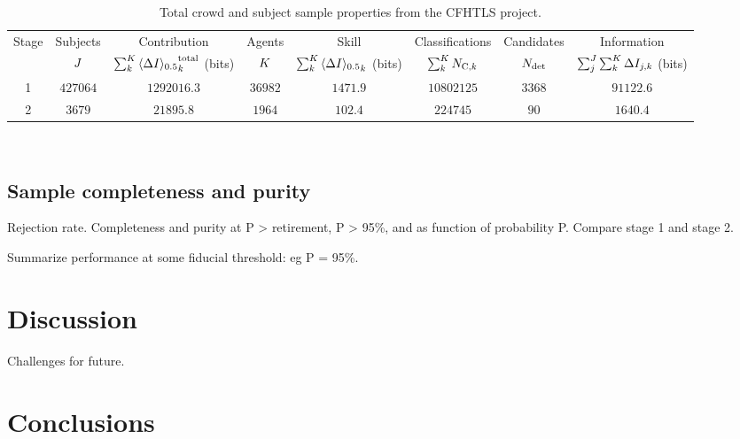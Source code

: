 \documentclass[useAMS,usenatbib,a4paper]{mn2e}
\begin{document}
\begin{table}
\begin{center}
\caption{Total crowd and subject sample properties from the CFHTLS project.}
\label{tab:crowd:contributions}
\begin{tabular}{cccccccc}
  \hline
  \hline {Stage} & Subjects & Contribution                          & Agents & Skill      & Classifications          & Candidates & Information \\
                 & $J$    & $\sum_k^{K} {\langle \Delta I \rangle_{0.5}}^{\rm total}_k$ (bits) & $K$  & $\sum_k^{K} {\langle \Delta I \rangle_{0.5}}_k$ (bits) & $\sum_k^{K} N_{{\rm C},k}$ & $N_{\rm det}$  & $\sum_j^{J}\sum_k^{K} \Delta I_{j,k}$ (bits) \\
  \hline 
            1    & $427064$ & $1292016.3$ & $36982$ & $1471.9$ & $10802125$ & $3368$ & $91122.6$ \\
            2    & $3679$   &   $21895.8$ &  $1964$ &  $102.4$ &   $224745$ &   $90$ &  $1640.4$ \\
  \hline \hline
\end{tabular}
\medskip\\
\end{center}
\end{table}


\subsection{Sample completeness and purity}
\label{sec:results:sample}

Rejection rate. Completeness and purity at P > retirement, P > 95\%, and 
as function of probability P. Compare stage 1 and stage 2. 

Summarize performance at some fiducial threshold: eg P = 95\%.



\section{Discussion}
\label{sec:discuss}

Challenges for future.


\section{Conclusions}
\label{sec:conclude}
\end{document}
